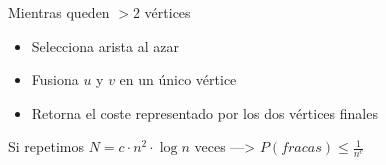 Mientras queden $> 2$ vértices
\begin{itemize}
\item Selecciona arista al azar
\item Fusiona $u$ y $v$ en un único vértice
\item Retorna el coste representado por los dos vértices finales
\end{itemize}
Si repetimos $N = c \cdot n^2 \cdot \log n$ veces —> $P(fracas) \leq \frac{1}{n^c}$

